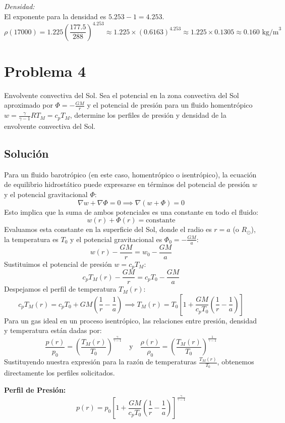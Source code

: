 \documentclass[a4paper]{article}
\begin{document}
\textit{Densidad:} \\
El exponente para la densidad es $5.253 - 1 = 4.253$.
$$ \rho(17000) = 1.225 \left( \frac{177.5}{288} \right)^{4.253} \approx 1.225 \times (0.6163)^{4.253} \approx 1.225 \times 0.1305 \approx 0.160 \text{ kg/m}^3 $$


\section{Problema 4}

Envolvente convectiva del Sol. Sea el potencial en la zona convectiva del Sol aproximado por $\Phi= -\frac{GM}{r}$ y el potencial de presión para un fluido homentrópico $w= \frac{\gamma}{\gamma-1} R T_M = c_p T_M$, determine los perfiles de presión y densidad de la envolvente convectiva del Sol.

\subsection{Solución}

Para un fluido barotrópico (en este caso, homentrópico o isentrópico), la ecuación de equilibrio hidrostático puede expresarse en términos del potencial de presión $w$ y el potencial gravitacional $\Phi$:
$$ \nabla w + \nabla \Phi = 0 \implies \nabla (w + \Phi) = 0 $$
Esto implica que la suma de ambos potenciales es una constante en todo el fluido:
$$ w(r) + \Phi(r) = \text{constante} $$
Evaluamos esta constante en la superficie del Sol, donde el radio es $r = a$ (o $R_\odot$), la temperatura es $T_0$ y el potencial gravitacional es $\Phi_0 = -\frac{GM}{a}$:
$$ w(r) - \frac{GM}{r} = w_0 - \frac{GM}{a} $$
Sustituimos el potencial de presión $w = c_p T_M$:
$$ c_p T_M(r) - \frac{GM}{r} = c_p T_0 - \frac{GM}{a} $$
Despejamos el perfil de temperatura $T_M(r)$:
$$ c_p T_M(r) = c_p T_0 + GM \left( \frac{1}{r} - \frac{1}{a} \right) \implies T_M(r) = T_0 \left[ 1 + \frac{GM}{c_p T_0} \left( \frac{1}{r} - \frac{1}{a} \right) \right] $$
Para un gas ideal en un proceso isentrópico, las relaciones entre presión, densidad y temperatura están dadas por:
$$ \frac{p(r)}{p_0} = \left( \frac{T_M(r)}{T_0} \right)^{\frac{\gamma}{\gamma-1}} \quad \text{y} \quad \frac{\rho(r)}{\rho_0} = \left( \frac{T_M(r)}{T_0} \right)^{\frac{1}{\gamma-1}} $$
Sustituyendo nuestra expresión para la razón de temperaturas $\frac{T_M(r)}{T_0}$, obtenemos directamente los perfiles solicitados.

\textbf{Perfil de Presión:}
$$ p(r) = p_0 \left[ 1 + \frac{GM}{c_p T_0} \left( \frac{1}{r} - \frac{1}{a} \right) \right]^{\frac{\gamma}{\gamma-1}} $$
\end{document}
